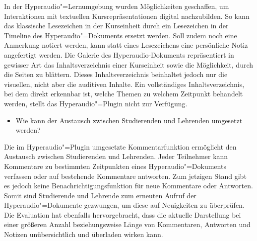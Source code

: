 \hfill\begin{minipage}{\textwidth-1cm}
\vspace{0.1cm}
In der Hyperaudio"=Lernumgebung wurden Möglichkeiten geschaffen, um Interaktionen mit textuellen Kursrepräsentationen digital nachzubilden. So kann das klassische Lesezeichen in der Kurseinheit durch ein Lesezeichen in der Timeline des Hyperaudio"=Dokuments ersetzt werden. Soll zudem noch eine Anmerkung notiert werden, kann statt eines Lesezeichens eine persönliche Notiz angefertigt werden. Die Galerie des Hyperaudio-Dokuments repräsentiert in gewisser Art das Inhaltsverzeichnis einer Kurseinheit sowie die Möglichkeit, durch die Seiten zu blättern. Dieses \glqq Inhaltsverzeichnis\grqq{} beinhaltet jedoch nur die visuellen, nicht aber die auditiven Inhalte. Ein vollständiges Inhaltsverzeichnis, bei dem direkt erkennbar ist, welche Themen zu welchem Zeitpunkt behandelt werden, stellt das Hyperaudio"=Plugin nicht zur Verfügung.
\vspace{0.25cm}
\end{minipage}

\begin{itemize}
\item Wie kann der Austausch zwischen Studierenden und Lehrenden umgesetzt werden?
\end{itemize}

\hfill\begin{minipage}{\textwidth-1cm}
\vspace{0.1cm}
Die im Hyperaudio"=Plugin umgesetzte Kommentarfunktion ermöglicht den Austausch zwischen Studierenden und Lehrenden. Jeder Teilnehmer kann Kommentare zu bestimmten Zeitpunkten eines Hyperaudio"=Dokuments verfassen oder auf bestehende Kommentare antworten. Zum jetzigen Stand gibt es jedoch keine Benachrichtigungsfunktion für neue Kommentare oder Antworten. Somit sind Studierende und Lehrende zum erneuten Aufruf der Hyperaudio"=Dokumente gezwungen, um diese auf Neuigkeiten zu überprüfen. Die Evaluation hat ebenfalls hervorgebracht, dass die aktuelle Darstellung bei einer größeren Anzahl beziehungsweise Länge von Kommentaren, Antworten und Notizen unübersichtlich und überladen wirken kann.
\vspace{0.25cm}
\end{minipage}

